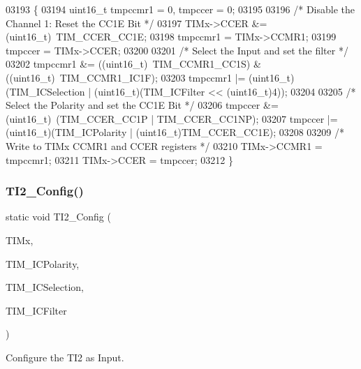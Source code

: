 \begin{DoxyCode}
03193 \{
03194   uint16\_t tmpccmr1 = 0, tmpccer = 0;
03195 
03196   \textcolor{comment}{/* Disable the Channel 1: Reset the CC1E Bit */}
03197   TIMx->CCER &= (uint16\_t)~TIM_CCER_CC1E;
03198   tmpccmr1 = TIMx->CCMR1;
03199   tmpccer = TIMx->CCER;
03200 
03201   \textcolor{comment}{/* Select the Input and set the filter */}
03202   tmpccmr1 &= ((uint16\_t)~TIM_CCMR1_CC1S) & ((uint16\_t)~TIM_CCMR1_IC1F);
03203   tmpccmr1 |= (uint16\_t)(TIM\_ICSelection | (uint16\_t)(TIM\_ICFilter << (uint16\_t)4));
03204 
03205   \textcolor{comment}{/* Select the Polarity and set the CC1E Bit */}
03206   tmpccer &= (uint16\_t)~(TIM_CCER_CC1P | TIM_CCER_CC1NP);
03207   tmpccer |= (uint16\_t)(TIM\_ICPolarity | (uint16\_t)TIM_CCER_CC1E);
03208 
03209   \textcolor{comment}{/* Write to TIMx CCMR1 and CCER registers */}
03210   TIMx->CCMR1 = tmpccmr1;
03211   TIMx->CCER = tmpccer;
03212 \}
\end{DoxyCode}
\mbox{\label{group__TIM__Private__Functions_gafed528b30af910d7e55ebd1d22a9a58f}} 
\subsubsection{T\+I2\+\_\+\+Config()}
{\footnotesize\ttfamily static void T\+I2\+\_\+\+Config (\begin{DoxyParamCaption}\item[{\textbf{ T\+I\+M\+\_\+\+Type\+Def} $\ast$}]{T\+I\+Mx,  }\item[{uint16\+\_\+t}]{T\+I\+M\+\_\+\+I\+C\+Polarity,  }\item[{uint16\+\_\+t}]{T\+I\+M\+\_\+\+I\+C\+Selection,  }\item[{uint16\+\_\+t}]{T\+I\+M\+\_\+\+I\+C\+Filter }\end{DoxyParamCaption})\hspace{0.3cm}{\ttfamily [static]}}



Configure the T\+I2 as Input. 


